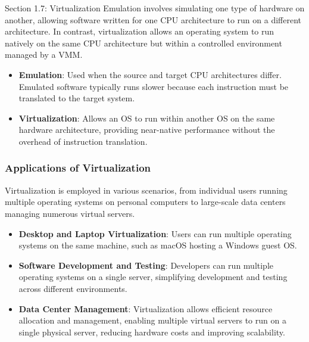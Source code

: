 \begin{notes}{Section 1.7: Virtualization}
    Emulation involves simulating one type of hardware on another, allowing software written for one CPU architecture to run on a different architecture. In contrast, virtualization allows an operating 
    system to run natively on the same CPU architecture but within a controlled environment managed by a VMM.
    
    \begin{highlight}
    
    \begin{itemize}
        \item \textbf{Emulation}: Used when the source and target CPU architectures differ. Emulated software typically runs slower because each instruction must be translated to the target system.
        \item \textbf{Virtualization}: Allows an OS to run within another OS on the same hardware architecture, providing near-native performance without the overhead of instruction translation.
    \end{itemize}
    
    \end{highlight}
    
    \subsubsection*{Applications of Virtualization}
    
    Virtualization is employed in various scenarios, from individual users running multiple operating systems on personal computers to large-scale data centers managing numerous virtual servers.
    
    \begin{highlight}
    
    \begin{itemize}
        \item \textbf{Desktop and Laptop Virtualization}: Users can run multiple operating systems on the same machine, such as macOS hosting a Windows guest OS.
        \item \textbf{Software Development and Testing}: Developers can run multiple operating systems on a single server, simplifying development and testing across different environments.
        \item \textbf{Data Center Management}: Virtualization allows efficient resource allocation and management, enabling multiple virtual servers to run on a single physical server, reducing hardware 
        costs and improving scalability.
    \end{itemize}
    

\end{highlight}
\end{notes}

